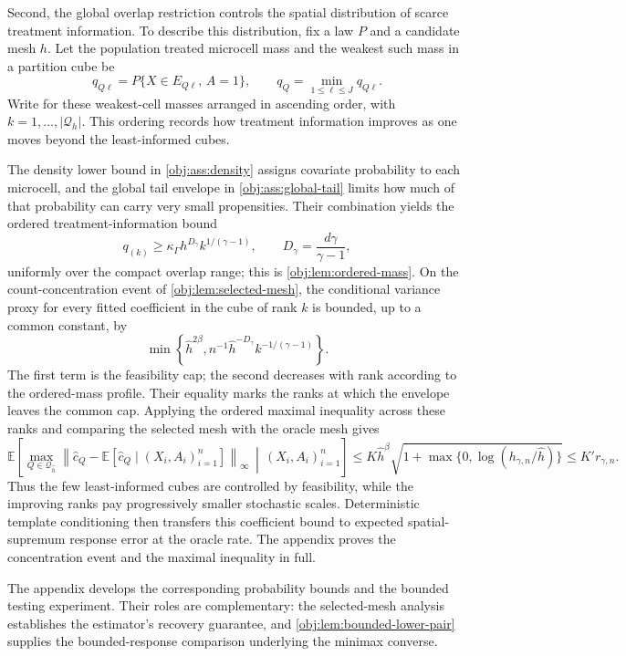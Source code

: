 Second, the global overlap restriction controls the spatial distribution of scarce treatment information. To describe this distribution, fix a law \(P\) and a candidate mesh \(h\). Let the population treated microcell mass  and the weakest such mass in a partition cube  be
\[
q_{Q\ell}
=
P\{X\in E_{Q\ell},\,A=1\},
\qquad
q_Q=\min_{1\le\ell\le J}q_{Q\ell}.
\]
Write  for these weakest-cell masses arranged in ascending order, with \(k=1,\ldots,|\mathcal Q_h|\). This ordering records how treatment information improves as one moves beyond the least-informed cubes.

The density lower bound in \cref{obj:ass:density} assigns covariate probability to each microcell, and the global tail envelope in \cref{obj:ass:global-tail} limits how much of that probability can carry very small propensities. Their combination yields the ordered treatment-information bound
\[
q_{(k)}\ge \kappa_\Gamma h^{D_\gamma}k^{1/(\gamma-1)},
\qquad
D_\gamma=\frac{d\gamma}{\gamma-1},
\]
uniformly over the compact overlap range; this is \cref{obj:lem:ordered-mass}. On the count-concentration event of \cref{obj:lem:selected-mesh}, the conditional variance proxy for every fitted coefficient in the cube of rank \(k\) is bounded, up to a common constant, by
\[
\min\!\left\{
\widehat h^{2\beta},
n^{-1}\widehat h^{-D_\gamma}k^{-1/(\gamma-1)}
\right\}.
\]
The first term is the feasibility cap; the second decreases with rank according to the ordered-mass profile. Their equality marks the ranks at which the envelope leaves the common cap. Applying the ordered maximal inequality across these ranks and comparing the selected mesh with the oracle mesh gives
\[
\mathbb E\!\left[
\max_{Q\in\mathcal Q_{\widehat h}}
\left\|\widehat c_Q-
\mathbb E[\widehat c_Q\mid(X_i,A_i)_{i=1}^n]\right\|_\infty
\,\middle|\,(X_i,A_i)_{i=1}^n
\right]
\le K\widehat h^\beta
\sqrt{1+\max\{0,\log(h_{\gamma,n}/\widehat h)\}}
\le K'r_{\gamma,n}.
\]
Thus the few least-informed cubes are controlled by feasibility, while the improving ranks pay progressively smaller stochastic scales. Deterministic template conditioning then transfers this coefficient bound to expected spatial-supremum response error at the oracle rate. The appendix proves the concentration event and the maximal inequality in full.

The appendix develops the corresponding probability bounds and the bounded testing experiment. Their roles are complementary: the selected-mesh analysis establishes the estimator's recovery guarantee, and \cref{obj:lem:bounded-lower-pair} supplies the bounded-response comparison underlying the minimax converse.
